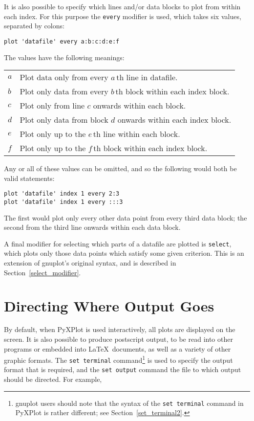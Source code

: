 \documentclass[a4paper,onecolumn,11pt]{book}
\begin{document}
It is also possible to specify which lines and/or data blocks to plot from
within each index. For this purpose the \texttt{every} modifier is used, which
takes six values, separated by colons:

\begin{verbatim}
plot 'datafile' every a:b:c:d:e:f
\end{verbatim}

The values have the following meanings:

\begin{longtable}{p{1.0cm}p{10.5cm}}
$a$ & Plot data only from every $a\,$th line in datafile. \\
$b$ & Plot only data from every $b\,$th block within each index block. \\
$c$ & Plot only from line $c$ onwards within each block. \\
$d$ & Plot only data from block $d$ onwards within each index block. \\
$e$ & Plot only up to the $e\,$th line within each block. \\
$f$ & Plot only up to the $f\,$th block within each index block. \\
\end{longtable}

\noindent Any or all of these values can be omitted, and so the following would
both be valid statements:

\begin{verbatim}
plot 'datafile' index 1 every 2:3
plot 'datafile' index 1 every :::3
\end{verbatim}

\noindent The first would plot only every other data point from every third
data block; the second from the third line onwards within each data block.

A final modifier for selecting which parts of a datafile are plotted is
\texttt{select}, which plots only those data points which satisfy some given
criterion. This is an extension of gnuplot's original syntax, and is described
in Section~\ref{select_modifier}.

\section{Directing Where Output Goes}
\label{directing_output}

By default, when PyXPlot is used interactively, all plots are displayed on the
screen. It is also possible to produce postscript output, to be read into other
programs or embedded into \LaTeX\ documents, as well as a variety of other
graphic formats. The \texttt{set terminal} command\footnote{gnuplot users should note that
the syntax of the \texttt{set terminal} command in PyXPlot is rather different;
see Section~\ref{set_terminal2}.} is used to specify the output format that is
required, and the \texttt{set output} command the file to which output should be
directed. For example,
\end{document}
